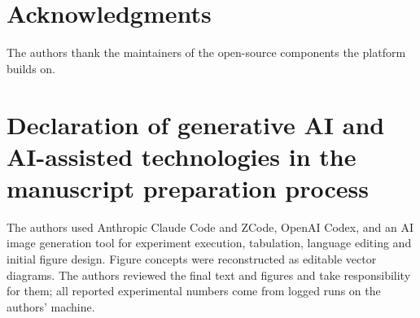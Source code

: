 \section*{Acknowledgments}
The authors thank the maintainers of the open-source components the platform
builds on. %

\section*{Declaration of generative AI and AI-assisted technologies in the manuscript preparation process}
The authors used Anthropic Claude Code and ZCode, OpenAI Codex, and an AI image
generation tool for experiment execution, tabulation, language editing and initial figure
design. Figure concepts were reconstructed as editable vector diagrams. The
authors reviewed the final text and figures and take responsibility for them;
all reported experimental numbers come from logged runs on the authors'
machine.
